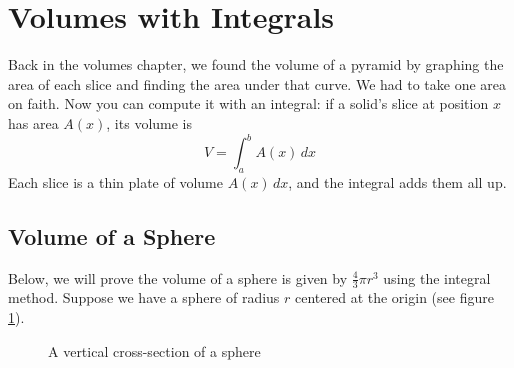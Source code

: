 \section{Volumes with Integrals}
Back in the volumes chapter, we found the volume of a pyramid by graphing
the area of each slice and finding the area under that curve. We had to
take one area on faith. Now you can compute it with an integral: if a
solid's slice at position $x$ has area $A(x)$, its volume is
$$V = \int_a^b A(x)\,dx$$
Each slice is a thin plate of volume $A(x)\,dx$, and the integral adds them
all up.
\subsection{Volume of a Sphere}
Below, we will prove the volume of a sphere is given by $\frac{4}{3}\pi r^3$ 
using the integral method. Suppose we have a sphere of radius $r$ centered at 
the origin (see figure \ref{fig:sphere}).

\begin{figure}[H]
\centering
    \caption{A vertical cross-section of a sphere}
    \label{fig:sphere}
\end{figure}

